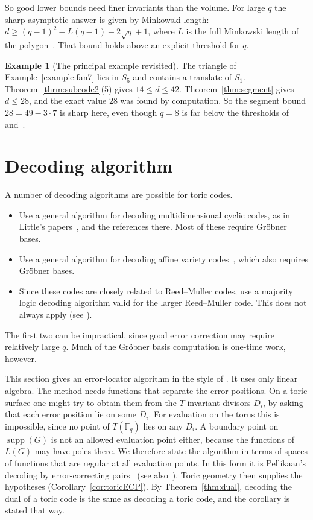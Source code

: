 \documentclass[12pt,letterpaper]{article}
\numberwithin{equation}{section}
\theoremstyle{definition}
\newtheorem{example}[theorem]{Example}
\theoremstyle{remark}
\DeclareMathOperator{\supp}{supp}
\newcommand{\Fq}{\mathbb{F}_q}
\begin{document}
So good lower bounds need finer invariants than the volume. For large $q$ the
sharp asymptotic answer is given by Minkowski length:
$d\ge(q-1)^2-L(q-1)-2\sqrt q+1$, where $L$ is the full Minkowski length of the
polygon~\cite[Thm.~1]{SS09}. That bound holds above an explicit threshold
for $q$.

\begin{example}[The principal example revisited]\label{ex:principal2}
The triangle of Example~\ref{example:fan7} lies in $S_5$ and contains a
translate of $S_1$. Theorem~\ref{thrm:subcode2}(5) gives $14\le d\le42$.
Theorem~\ref{thm:segment} gives $d\le28$, and the exact value $28$ was found by
computation. So the segment bound $28=49-3\cdot7$ is sharp here, even though
$q=8$ is far below the thresholds of~\cite{LS06} and~\cite{SS09}.
\end{example}

\section{Decoding algorithm}\label{sec:decode}

A number of decoding algorithms are possible for toric codes.
\begin{itemize}[leftmargin=*]
\item Use a general algorithm for decoding multidimensional cyclic codes, as
in Little's papers~\cite{Li03a}, \cite{Li03b} and the references there. Most
of these require Gr\"obner bases.
\item Use a general algorithm for decoding affine variety codes~\cite{FL98},
which also requires Gr\"obner bases.
\item Since these codes are closely related to Reed--Muller codes, use a
majority logic decoding algorithm valid for the larger Reed--Muller code. This
does not always apply (see \cite[Ch.~13, \S7]{MS77}).
\end{itemize}
The first two can be impractical, since good error correction may require
relatively large $q$. Much of the Gr\"obner basis computation is one-time
work, however.

This section gives an error-locator algorithm in the style of
\cite[pp.~217--218]{St93}. It uses only linear algebra. The method needs
functions that separate the error positions. On a toric surface one might try
to obtain them from the $T$-invariant divisors $D_i$, by asking that each
error position lie on some $D_i$. For evaluation on the torus this is
impossible, since no point of $T(\Fq)$ lies on any $D_i$. A boundary point on
$\supp(G)$ is not an allowed evaluation point either, because the functions
of $L(G)$ may have poles there. We therefore state the algorithm in terms of
spaces of functions that are regular at all evaluation points. In
this form it is Pellikaan's decoding by error-correcting pairs~\cite{Pe92}
(see also~\cite{Ha17}). Toric geometry then supplies the hypotheses
(Corollary~\ref{cor:toricECP}). By Theorem~\ref{thm:dual}, decoding the dual
of a toric code is the same as decoding a toric code, and the corollary is
stated that way.
\end{document}
